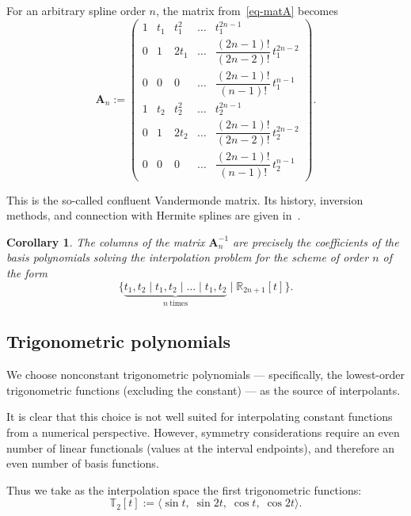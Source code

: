 \documentclass{article}
\newtheorem{corollary}{Corollary}[theorem]
\theoremstyle{definition}
\theoremstyle{definition}
\numberwithin{figure}{section}
\newcommand{\1}{\mathbf{1}}
\begin{document}
For an arbitrary spline order \(n\), the matrix from~\eqref{eq-matA} becomes
\begin{equation}\label{eq-CVM}
\mathbf{A}_n :=
\begin{pmatrix}
1 & t_1 & t_1^2 & \dots & t_1^{2n-1}\\[2pt]
0 & 1 & 2t_1 & \dots & \dfrac{(2n-1)!}{(2n-2)!}\,t_1^{2n-2}\\[2pt]
0 & 0 & 0 & \dots & \dfrac{(2n-1)!}{(n-1)!}\,t_1^{n-1}\\[2pt]
1 & t_2 & t_2^2 & \dots & t_2^{2n-1}\\[2pt]
0 & 1 & 2t_2 & \dots & \dfrac{(2n-1)!}{(2n-2)!}\,t_2^{2n-2}\\[2pt]
0 & 0 & 0 & \dots & \dfrac{(2n-1)!}{(n-1)!}\,t_2^{n-1}
\end{pmatrix}.
\end{equation}

This is the so-called confluent Vandermonde matrix.  
Its history, inversion methods, and connection with Hermite splines are given in~\cite{respondek2024,li2025confluentvandermondematrixrelated}.

\begin{corollary}\label{corol-splinesgeneral}
The columns of the matrix \(\mathbf{A}_n^{-1}\) are precisely the coefficients of the basis polynomials solving the interpolation problem for the scheme of order \(n\) of the form
\[
    \{\underbrace{t_1, t_2 \mid t_1, t_2 \mid \dots \mid t_1, t_2}_{n\ \text{times}} \mid \mathbb{R}_{2n+1}[t]\}.
\]
\end{corollary}

\subsection{Trigonometric polynomials}\label{sec-trigpoly}

We choose nonconstant trigonometric polynomials — specifically, the lowest-order trigonometric functions (excluding the constant) — as the source of interpolants.

It is clear that this choice is not well suited for interpolating constant functions from a numerical perspective. However, symmetry considerations require an even number of linear functionals (values at the interval endpoints), and therefore an even number of basis functions.

Thus we take as the interpolation space the first trigonometric functions:
\begin{equation}\label{eq-T2}
    \mathbb{T}_2[t] := \langle \sin t,\; \sin 2t,\; \cos t,\; \cos 2t \rangle .
\end{equation}
\end{document}
